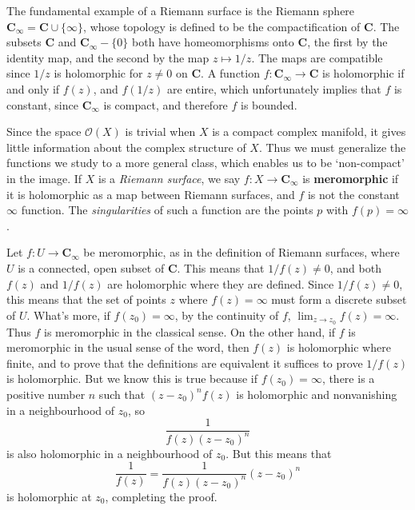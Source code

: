 \begin{example}
    The fundamental example of a Riemann surface is the Riemann sphere $\mathbf{C}_\infty = \mathbf{C} \cup \{ \infty \}$, whose topology is defined to be the compactification of $\mathbf{C}$. The subsets $\mathbf{C}$ and $\mathbf{C}_\infty - \{ 0 \}$ both have homeomorphisms onto $\mathbf{C}$, the first by the identity map, and the second by the map $z \mapsto 1/z$. The maps are compatible since $1/z$ is holomorphic for $z \neq 0$ on $\mathbf{C}$. A function $f: \mathbf{C}_\infty \to \mathbf{C}$ is holomorphic if and only if $f(z)$, and $f(1/z)$ are entire, which unfortunately implies that $f$ is constant, since $\mathbf{C}_\infty$ is compact, and therefore $f$ is bounded.
\end{example}

Since the space $\mathcal{O}(X)$ is trivial when $X$ is a compact complex manifold, it gives little information about the complex structure of $X$. Thus we must generalize the functions we study to a more general class, which enables us to be `non-compact' in the image. If $X$ is a {\it Riemann surface}, we say $f: X \to \mathbf{C}_\infty$ is {\bf meromorphic} if it is holomorphic as a map between Riemann surfaces, and $f$ is not the constant $\infty$ function. The {\it singularities} of such a function are the points $p$ with $f(p) = \infty$.

\begin{example}
    Let $f: U \to \mathbf{C}_\infty$ be meromorphic, as in the definition of Riemann surfaces, where $U$ is a connected, open subset of $\mathbf{C}$. This means that $1/f(z) \neq 0$, and both $f(z)$ and $1/f(z)$ are holomorphic where they are defined. Since $1/f(z) \neq 0$, this means that the set of points $z$ where $f(z) = \infty$ must form a discrete subset of $U$. What's more, if $f(z_0) = \infty$, by the continuity of $f$, $\lim_{z \to z_0} f(z) = \infty$. Thus $f$ is meromorphic in the classical sense. On the other hand, if $f$ is meromorphic in the usual sense of the word, then $f(z)$ is holomorphic where finite, and to prove that the definitions are equivalent it suffices to prove $1/f(z)$ is holomorphic. But we know this is true because if $f(z_0) = \infty$, there is a positive number $n$ such that $(z - z_0)^n f(z)$ is holomorphic and nonvanishing in a neighbourhood of $z_0$, so
    \[ \frac{1}{f(z) (z - z_0)^n} \]
    is also holomorphic in a neighbourhood of $z_0$. But this means that
    \[ \frac{1}{f(z)} = \frac{1}{f(z) (z - z_0)^n} (z - z_0)^n \]
    is holomorphic at $z_0$, completing the proof.
\end{example}

